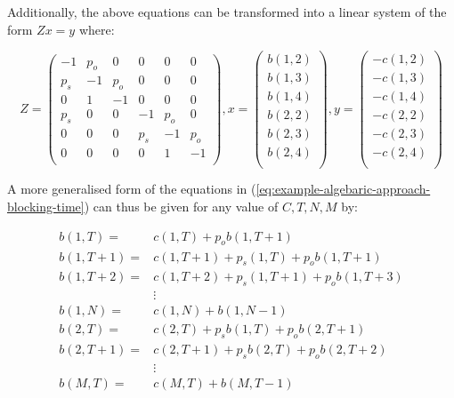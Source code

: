 Additionally, the above equations can be transformed into a linear system of the 
form \(Zx=y\) where:

\begin{equation}\label{eq:example-algebaric-approach-blocking-time}
    Z=
    \begin{pmatrix}
        -1 & p_o & 0 & 0 & 0 & 0 \\ %
        p_s & -1 & p_o & 0 & 0 & 0 \\ %
        0 & 1 & -1 & 0 & 0 & 0 \\ %
        p_s & 0 & 0 & -1 & p_o & 0\\ %
        0 & 0 & 0 & p_s & -1 & p_o \\ %
        0 & 0 & 0 & 0 & 1 & -1 \\ %
    \end{pmatrix},
    x=
    \begin{pmatrix}
        b(1,2) \\
        b(1,3) \\
        b(1,4) \\
        b(2,2) \\
        b(2,3) \\
        b(2,4) \\
    \end{pmatrix}, 
    y=
    \begin{pmatrix}
        -c(1,2) \\
        -c(1,3) \\
        -c(1,4) \\
        -c(2,2) \\
        -c(2,3) \\
        -c(2,4) \\
    \end{pmatrix}
\end{equation}

A more generalised form of the equations in 
(\ref{eq:example-algebaric-approach-blocking-time})
can thus be given for any value of \(C,T,N,M\) by:

\begin{align}
    b(1,T) =& c(1, T) + p_o b(1, T + 1) \label{eq:first_eq_of_blocking_general}\\
    b(1,T + 1) =& c(1, T + 1) + p_s(1, T) + p_o b(1, T + 1) \\
    b(1,T + 2) =& c(1, T + 2) + p_s(1, T + 1) + p_o b(1, T + 3) \\
    & \vdots \nonumber \\
    b(1, N) =& c(1, N) + b(1, N - 1) \\
    b(2, T) =& c(2, T) + p_s b(1, T) + p_o b(2, T + 1) \\
    b(2, T + 1) =& c(2, T + 1) + p_s b(2, T) + p_o b(2, T + 2) \\
    & \vdots \nonumber \\
    b(M, T) =& c(M, T) + b(M, T-1) \label{eq:last_eq_of_blocking_general}
\end{align}

